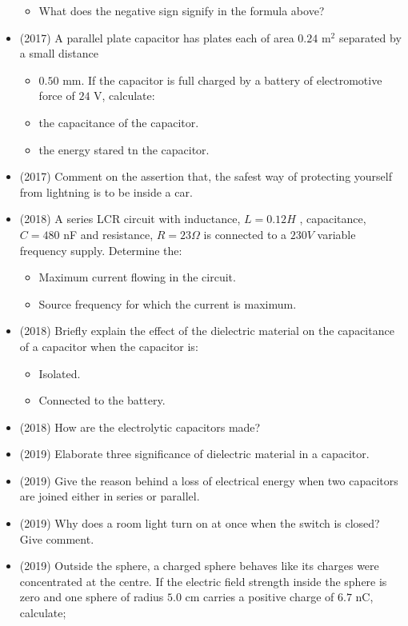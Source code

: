 \documentclass{article}
\begin{document}
\begin{itemize}
 \begin{itemize}
\item What does the negative sign signify in the formula above?
\end{itemize}
\item (2017)  A parallel plate capacitor has plates each of area $ 0.24$ m$ ^{2}$ separated by a small distance
 \begin{itemize}
\item $ 0.50$ mm. If the capacitor is full charged by a battery of electromotive force of $ 24$ V, calculate:
\item the capacitance of the capacitor. 
\item the energy stared tn the capacitor. 
\end{itemize}
\item (2017)  Comment on the assertion that, the safest way of protecting yourself from lightning is to be inside a car. 
\item (2018)  A series LCR circuit with inductance, $ L=0.12H$ , capacitance, $ C=480$ nF and resistance, $ R=23\Omega $ is connected to a $ 230V$ variable frequency supply. Determine the:
 \begin{itemize}
\item Maximum current flowing in the circuit. 
\item Source frequency for which the current is maximum. 
\end{itemize}
\item (2018)  Briefly explain the effect of the dielectric material on the capacitance of a capacitor when the capacitor is:
 \begin{itemize}
\item Isolated. 
\item Connected to the battery.
\end{itemize}
\item (2018)  How are the electrolytic capacitors made? 
\item (2019)  Elaborate three significance of dielectric material in a capacitor. 
\item (2019)  Give the reason behind a loss of electrical energy when two capacitors are joined either in series or parallel. 
\item (2019)  Why does a room light turn on at once when the switch is closed? Give comment.
\item (2019)  Outside the sphere, a charged sphere behaves like its charges were concentrated at the centre. If the electric field strength inside the sphere is zero and one sphere of radius $ 5.0$ cm carries a positive charge of $ 6.7$ nC, calculate; 

\end{itemize}
\end{document}
